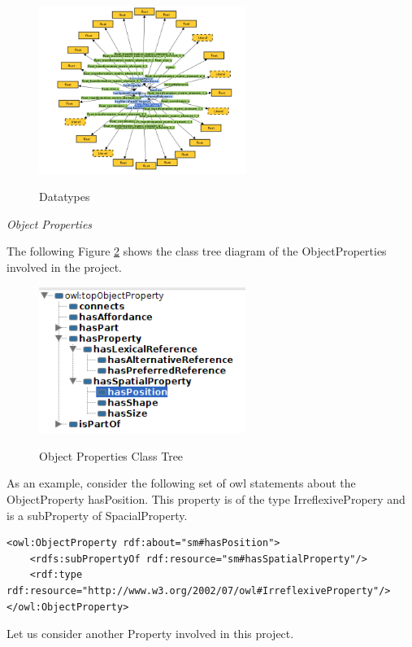 \begin{figure}[H]
\centering
\includegraphics[width=0.6\textwidth]{imgs/Datatype.png}
\label{fig:datatypes}
\caption{Datatypes}
\end{figure}

\textit{Object Properties}

The following Figure \ref{fig:propClassTree} shows the class tree diagram of the ObjectProperties involved in the project.
\begin{figure}[H]
\centering
\includegraphics[width=0.6\textwidth]{imgs/propClassTree.png}
\label{fig:propClassTree}
\caption{Object Properties Class Tree}
\end{figure}

As an example, consider the following set of owl statements about the ObjectProperty hasPosition. This property is of the type IrreflexivePropery and is a subProperty of SpacialProperty.


\begin{lstlisting}
<owl:ObjectProperty rdf:about="sm#hasPosition">
    <rdfs:subPropertyOf rdf:resource="sm#hasSpatialProperty"/>
    <rdf:type rdf:resource="http://www.w3.org/2002/07/owl#IrreflexiveProperty"/>
</owl:ObjectProperty>
\end{lstlisting}    

Let us consider another Property involved in this project.

